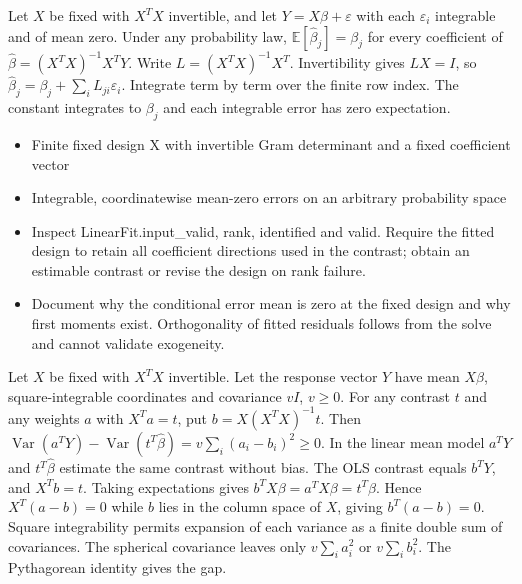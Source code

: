 \expandafter\def\csname statadic@statement@STATADIC-LINEAR-009\endcsname{Let $X$ be fixed with $X^T X$ invertible, and let
  $Y=X\beta+\varepsilon$ with each $\varepsilon_i$ integrable and of mean zero.
  Under any probability law, $\mathbb E[\hat\beta_j]=\beta_j$ for every
  coefficient of $\hat\beta=(X^T X)^{-1}X^T Y$.}
\expandafter\def\csname statadic@proof@STATADIC-LINEAR-009\endcsname{Write $L=(X^TX)^{-1}X^T$. Invertibility gives $LX=I$,
  so $\hat\beta_j=\beta_j+\sum_i L_{ji}\varepsilon_i$.
  Integrate term by term over the finite row index. The constant integrates
  to $\beta_j$ and each integrable error has zero expectation.}
\expandafter\def\csname statadic@assumptions@STATADIC-LINEAR-009\endcsname{\begin{itemize}
\item Finite fixed design X with invertible Gram determinant and a fixed coefficient vector
\item Integrable, coordinatewise mean-zero errors on an arbitrary probability space
\end{itemize}}
\expandafter\def\csname statadic@diagnostics@STATADIC-LINEAR-009\endcsname{\begin{itemize}
\item Inspect LinearFit.input\_valid, rank, identified and valid. Require the fitted design to retain all coefficient directions used in the contrast; obtain an estimable contrast or revise the design on rank failure.
\item Document why the conditional error mean is zero at the fixed design and why first moments exist. Orthogonality of fitted residuals follows from the solve and cannot validate exogeneity.
\end{itemize}}
\expandafter\def\csname statadic@statement@STATADIC-LINEAR-010\endcsname{Let $X$ be fixed with $X^TX$ invertible. Let the response
  vector $Y$ have mean $X\beta$, square-integrable coordinates and covariance $vI$, $v\ge0$.
  For any contrast $t$ and any weights $a$ with $X^Ta=t$, put $b=X(X^TX)^{-1}t$.
  Then $\operatorname{Var}(a^TY)-\operatorname{Var}(t^T\hat\beta)
  = v\sum_i(a_i-b_i)^2\ge0$. In the linear mean model $a^TY$ and
  $t^T\hat\beta$ estimate the same contrast without bias.}
\expandafter\def\csname statadic@proof@STATADIC-LINEAR-010\endcsname{The OLS contrast equals $b^TY$, and $X^Tb=t$. Taking expectations
  gives $b^TX\beta=a^TX\beta=t^T\beta$.
  Hence $X^T(a-b)=0$ while $b$ lies in the column space of $X$, giving
  $b^T(a-b)=0$. Square integrability permits expansion of each variance as
  a finite double sum of covariances. The spherical covariance leaves only
  $v\sum_i a_i^2$ or $v\sum_i b_i^2$. The Pythagorean identity gives the gap.}
